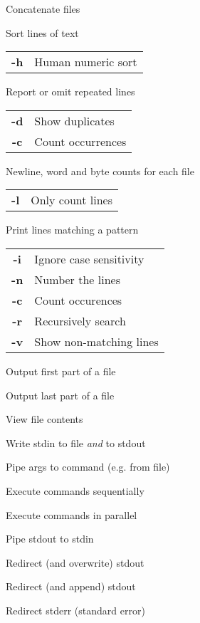 \documentclass[12pt, a4paper]
{article}
\begin{document}
\begin{multicols}{3}
		\begin{description}[nolistsep]
			\item[cat] Concatenate files
			\item[sort] Sort lines of text
			\item
			\begin{tabular}{cl}
				{\large \ttfamily \textbf{-h}} & Human numeric sort
			\end{tabular}
			\item[uniq] Report or omit repeated lines
			\item
			\begin{tabular}{cl}
				{\large \ttfamily \textbf{-d}} & Show duplicates \\
				{\large \ttfamily \textbf{-c}} & Count occurrences
			\end{tabular}
			\item[wc] Newline, word and byte counts for each file
			\item
			\begin{tabular}{cl}
				{\large \ttfamily \textbf{-l}} & Only count lines
			\end{tabular}
			\item[grep] Print lines matching a pattern
			\item
			\begin{tabular}{cl}
				{\large \ttfamily \textbf{-i}} & Ignore case sensitivity \\
				{\large \ttfamily \textbf{-n}} & Number the lines \\
				{\large \ttfamily \textbf{-c}} & Count occurences \\
				{\large \ttfamily \textbf{-r}} & Recursively search \\
				{\large \ttfamily \textbf{-v}} & Show non-matching lines
			\end{tabular}
			\item[head] Output first part of a file
			\item[tail] Output last part of a file
			\item[less] View file contents
			\item[tee] Write stdin to file \emph{and} to stdout
			\item[xargs] Pipe args to command (e.g. from file)
		\end{description}
		
		
		\begin{description}[nolistsep]
			\item[\&\&] Execute commands sequentially
			\item[\&] Execute commands in parallel
			\item[|] Pipe stdout to stdin
			\item[>] Redirect (and overwrite) stdout
			\item[>>] Redirect (and append) stdout 
			\item[2>] Redirect stderr (standard error)
		\end{description}
		

\end{multicols}
\end{document}

